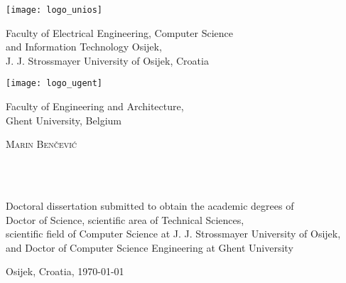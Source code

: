
\begin{titlepage}

\begin{minipage}{3.5cm}
\texttt{[image: logo\_unios]}
\end{minipage}
\begin{minipage}{0.7\textwidth}
Faculty of Electrical Engineering, Computer Science\\and Information Technology Osijek,\\J. J. Strossmayer University of Osijek, Croatia
\end{minipage}

\vspace{1cm}

\begin{minipage}{3.5cm}
\centering
\texttt{[image: logo\_ugent]}
\end{minipage}
\begin{minipage}{0.7\textwidth}
Faculty of Engineering and Architecture,\\ Ghent University, Belgium
\end{minipage}


  \begin{center}
  	\vspace{3cm}
     \textsc{\Large Marin Benčević}\\[0.5cm] %
   
     \HRule \\[0.4cm] %
     {\huge \bfseries \ttitle\par}\vspace{0.4cm} %
     \HRule \\[1.5cm] %
\end{center}
     {\large Doctoral dissertation submitted to obtain the academic degrees of\\Doctor of Science, scientific area of Technical Sciences,\\ scientific field of Computer Science at J. J. Strossmayer University of Osijek,\\and Doctor of Computer Science Engineering at Ghent University}\\[0.5cm] %
\begin{center}
     \vfill
   
     \vfill
   
     {Osijek, Croatia, \today}\\[2cm] %
  \end{center}
\end{titlepage}